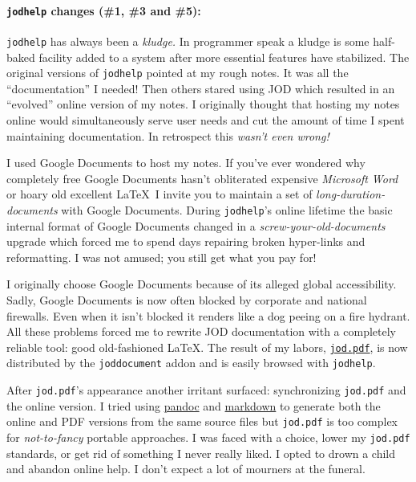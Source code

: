 \paragraph{\texorpdfstring{\texttt{jodhelp} changes (\#1, \#3 and
\#5):}{jodhelp changes (\#1, \#3 and \#5):}}

\texttt{jodhelp} has always been a \emph{kludge.} In programmer speak a
kludge is some half-baked facility added to a system after more
essential features have stabilized. The original versions of
\texttt{jodhelp} pointed at my rough notes. It was all the
``documentation'' I needed! Then others stared using JOD which resulted
in an ``evolved'' online version of my notes. I originally thought that
hosting my notes online would simultaneously serve user needs and cut
the amount of time I spent maintaining documentation. In retrospect this
\emph{wasn't even wrong!}

I used Google Documents to host my notes. If you've ever wondered why
completely free Google Documents hasn't obliterated expensive
\emph{Microsoft Word} or hoary old excellent \LaTeX\ I invite you
to maintain a set of \emph{long-duration-documents} with Google
Documents. During \texttt{jodhelp}'s online lifetime the basic internal
format of Google Documents changed in a \emph{screw-your-old-documents}
upgrade which forced me to spend days repairing broken hyper-links and
reformatting. I was not amused; you still get what you pay for!

I originally choose Google Documents because of its alleged global
accessibility. Sadly, Google Documents is now often blocked by corporate
and national firewalls. Even when it isn't blocked it renders like a dog
peeing on a fire hydrant. All these problems forced me to rewrite JOD
documentation with a completely reliable tool: good old-fashioned
\LaTeX. The result of my labors,
\href{https://app.box.com/shared/gajfu50gc0}{\texttt{jod.pdf}}, is now
distributed by the \texttt{joddocument} addon and is easily browsed with
\texttt{jodhelp}.

After \texttt{jod.pdf}'s appearance another irritant surfaced:
synchronizing \texttt{jod.pdf} and the online version. I tried using
\href{http://pandoc.org/}{pandoc} and
\href{http://daringfireball.net/projects/markdown/}{markdown} to
generate both the online and PDF versions from the same source files but
\texttt{jod.pdf} is too complex for \emph{not-to-fancy} portable
approaches. I was faced with a choice, lower my \texttt{jod.pdf}
standards, or get rid of something I never really liked. I opted to
drown a child and abandon online help. I don't expect a lot of mourners
at the funeral.

